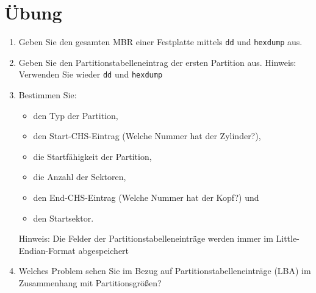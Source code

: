 \documentclass[11pt,a4paper]{article}
\def\inlinebash{\lstinline[style=bash]}
\begin{document}
\section{Übung}
\begin{enumerate}
	\item Geben Sie den gesamten MBR einer Festplatte mittels \inlinebash$dd$ und 
		\inlinebash$hexdump$ aus.
	\item Geben Sie den Partitionstabelleneintrag der ersten Partition aus. Hinweis:
		Verwenden Sie wieder \inlinebash$dd$ und \inlinebash$hexdump$
	\item Bestimmen Sie:
		\begin{itemize}
			\item den Typ der Partition,
			\item den Start-CHS-Eintrag (Welche Nummer hat der Zylinder?),
			\item die Startfähigkeit der Partition,
			\item die Anzahl der Sektoren,
			\item den End-CHS-Eintrag (Welche Nummer hat der Kopf?) und
			\item den Startsektor.
		\end{itemize}
		Hinweis: Die Felder der Partitionstabelleneinträge werden immer im 
			Little-Endian-Format abgespeichert

	\item Welches Problem sehen Sie im Bezug auf Partitionstabelleneinträge (LBA) im Zusammenhang
		mit Partitionsgrößen?
\end{enumerate}
\end{document}
